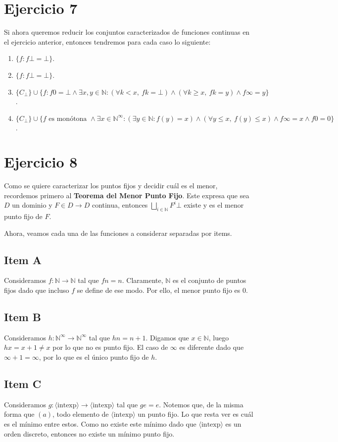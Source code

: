 \documentclass{article}
\newcommand{\aexp}[1]{\langle\text{#1}\rangle}
\newcommand{\intexp}{\aexp{intexp}}
\newcommand{\N}{\mathbb{N}}
\newcommand{\supr}{\bigsqcup\limits}
\begin{document}
\section*{Ejercicio 7}
Si ahora queremos reducir los conjuntos caracterizados de funciones continuas en el ejercicio anterior, entonces tendremos para cada caso lo siguiente:
\begin{enumerate}[label=(\alph*)]
	\item $\{f : f \bot = \bot\}$.
	\item $\{f : f \bot = \bot\}$.
	\item $\{C_\bot\} \cup \{f : f 0 = \bot \land \exists x, y \in \N : (\forall k < x,\ f k = \bot) \land (\forall k \geq x,\ f k = y) \land f \infty = y\}$.
	\item $\{C_\bot\} \cup \{f \text{ es monótona } \land \exists x \in \N^\infty : (\exists y \in \N : f(y) = x) \land (\forall y \leq x,\ f(y) \leq x) \land f \infty = x \land f 0 = 0\}$.
\end{enumerate}

\section*{Ejercicio 8}
Como se quiere caracterizar los puntos fijos y decidir cuál es el menor, recordemos primero al \textbf{Teorema del Menor Punto Fijo}.
Este expresa que sea $D$ un dominio y $F \in D \to D$ continua, entonces $\supr_{i \in \N} F^i \bot$ existe y es el menor punto fijo de $F$.

Ahora, veamos cada una de las funciones a considerar separadas por items.

\subsection*{Item A}
Consideramos $f : \N \to \N$ tal que $f n = n$.
Claramente, $\N$ es el conjunto de puntos fijos dado que incluso $f$ se define de ese modo.
Por ello, el menor punto fijo es $0$.

\subsection*{Item B}
Consideramos $h : \N^\infty \to \N^\infty$ tal que $h n = n + 1$.
Digamos que $x \in \N$, luego $h x = x + 1 \neq x$ por lo que no es punto fijo.
El caso de $\infty$ es diferente dado que $\infty + 1 = \infty$, por lo que es el único punto fijo de $h$.

\subsection*{Item C}
Consideramos $g : \intexp \to \intexp$ tal que $g e = e$.
Notemos que, de la misma forma que $(a)$, todo elemento de $\intexp$ un punto fijo.
Lo que resta ver es cuál es el mínimo entre estos.
Como no existe este mínimo dado que $\intexp$ es un orden discreto, entonces no existe un mínimo punto fijo.
\end{document}
